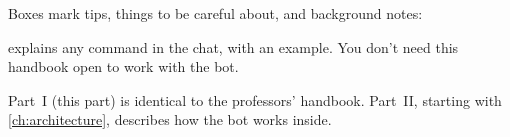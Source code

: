 Boxes mark tips, things to be careful about, and background notes:

\begin{tip}
 explains any command in the chat, with an example. You don't need this
handbook open to work with the bot.
\end{tip}

\iftechnical
\begin{note}
Part~I (this part) is identical to the professors' handbook. Part~II, starting with
\autoref{ch:architecture}, describes how the bot works inside.
\end{note}
\fi
